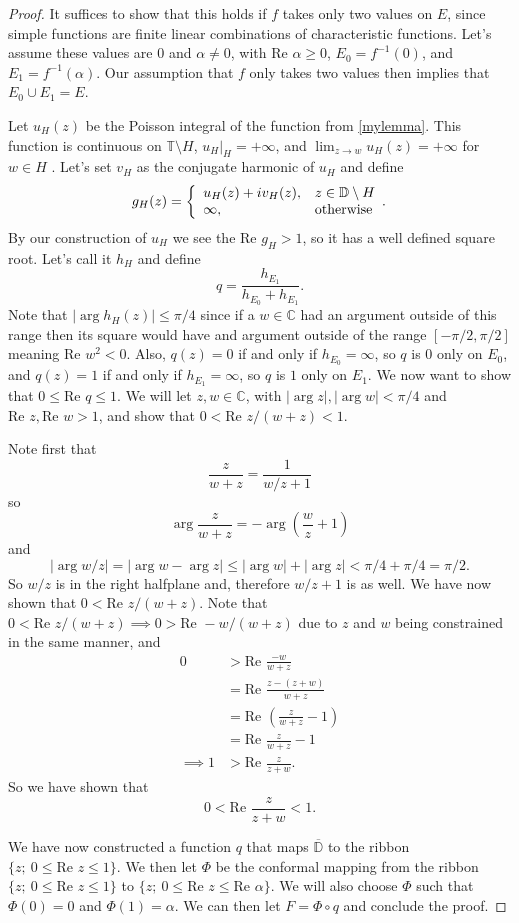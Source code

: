 \documentclass[a4paper,12pt,twoside,BCOR=10mm]{scrbook}
\theoremstyle{definition}
\theoremstyle{definition}
\theoremstyle{definition}
\renewcommand{\Re}{\text{Re }}
\begin{document}
\begin{proof}
It suffices to show that this holds if $f$ takes only two values on $E$, since simple functions are finite linear combinations of characteristic functions.
Let's assume these values are $0$ and $\alpha \neq 0$, with $\Re \alpha \geq 0$, $E_0 = f^{-1}(0)$, and $E_1 = f^{-1}(\alpha)$.
Our assumption that $f$ only takes two values then implies that $E_0 \cup E_1 = E$.

Let $u_H(z)$ be the Poisson integral of the function from \ref{mylemma}.
This function is continuous on $\mathbb{T} \setminus H$, $u_H|_H = +\infty$, and $\lim_{z \rightarrow w} u_H(z) = +\infty$ for $w \in H$ \citep[page $234$]{rudin2}.
Let's set $v_H$ as the conjugate harmonic of $u_H$ and define
\[
	g_H(z) =
	\left \{
		\begin{array}{l l}
		u_H(z) + iv_H(z), & z \in \mathbb{D} \setminus H\\
		\infty, & \text{otherwise}
		\end{array}.
	\right .
\]
By our construction of $u_H$ we see the $\Re g_H > 1$, so it has a well defined square root.
Let's call it $h_H$ and define
\[
	q = \frac{h_{E_1}}{h_{E_0} + h_{E_1}}.
\]
Note that $|\arg h_H(z)| \leq \pi/4$ since if a $w \in \mathbb{C}$ had an argument outside of this range then its square would have and argument outside of the range $[-\pi/2, \pi/2]$ meaning $\Re w^2 < 0$.
Also, $q(z) = 0$ if and only if $h_{E_0} = \infty$, so $q$ is $0$ only on $E_0$, and $q(z) = 1$ if and only if $h_{E_1} = \infty$, so $q$ is $1$ only on $E_1$.
We now want to show that $0 \leq \Re q \leq 1$.
We will let $z, w \in \mathbb{C}$, with $|\arg z|, |\arg w| < \pi/4$ and $\Re z, \Re w > 1$, and show that $0 < \Re z/(w + z) < 1$.

Note first that
\[
	\frac{z}{w + z}
	=
	\frac{1}{w/z + 1}
\]
so 
\[
	\arg \frac{z}{w + z} = -\arg \left ( \frac{w}{z} + 1 \right )
\]
and
\[
	|\arg w/z| = |\arg w - \arg z| \leq |\arg w| + |\arg z| < \pi/4 + \pi/4 = \pi/2.
\]
So $w/z$ is in the right halfplane and, therefore $w/z + 1$ is as well.
We have now shown that $0 < \Re z/(w + z)$.
Note that $0 < \Re z/(w + z) \implies 0 > \Re -w/(w + z)$ due to $z$ and $w$ being constrained in the same manner, and
\begin{align*}
	0
	&> \Re \frac{-w}{w + z}\\
	&= \Re \frac{z - (z + w)}{w + z}\\
	&= \Re \left ( \frac{z}{w + z} - 1 \right )\\
	&= \Re \frac{z}{w + z} - 1\\
	\implies 1 &> \Re \frac{z}{z + w}.
\end{align*}
So we have shown that
\[
	0 < \Re \frac{z}{z + w} < 1.
\]

We have now constructed a function $q$ that maps $\overline{\mathbb{D}}$ to the ribbon $\{z;\ 0 \leq \Re z \leq 1\}$.
We then let $\Phi$ be the conformal mapping from the ribbon $\{z;\ 0 \leq \Re z \leq 1\}$ to $\{z;\ 0 \leq \Re z \leq \Re \alpha\}$.
We will also choose $\Phi$ such that $\Phi(0) = 0$ and $\Phi(1) = \alpha$.
We can then let $F = \Phi \circ q$ and conclude the proof.

\end{proof}
\end{document}
